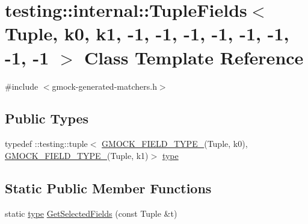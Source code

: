 \hypertarget{classtesting_1_1internal_1_1_tuple_fields_3_01_tuple_00_01k0_00_01k1_00_01-1_00_01-1_00_01-1_00_bfbbbfc9cc03949b0b1ff3620709d8ff}{}\section{testing\+:\+:internal\+:\+:Tuple\+Fields$<$ Tuple, k0, k1, -\/1, -\/1, -\/1, -\/1, -\/1, -\/1, -\/1, -\/1 $>$ Class Template Reference}
\label{classtesting_1_1internal_1_1_tuple_fields_3_01_tuple_00_01k0_00_01k1_00_01-1_00_01-1_00_01-1_00_bfbbbfc9cc03949b0b1ff3620709d8ff}


{\ttfamily \#include $<$gmock-\/generated-\/matchers.\+h$>$}

\subsection*{Public Types}
\begin{DoxyCompactItemize}
\item 
typedef \+::testing\+::tuple$<$ \hyperlink{gmock-generated-matchers_8h_acf3e27de83a73f0d873da1cd471e505b}{G\+M\+O\+C\+K\+\_\+\+F\+I\+E\+L\+D\+\_\+\+T\+Y\+P\+E\+\_\+}(Tuple, k0), \hyperlink{gmock-generated-matchers_8h_acf3e27de83a73f0d873da1cd471e505b}{G\+M\+O\+C\+K\+\_\+\+F\+I\+E\+L\+D\+\_\+\+T\+Y\+P\+E\+\_\+}(Tuple, k1)$>$ \hyperlink{classtesting_1_1internal_1_1_tuple_fields_3_01_tuple_00_01k0_00_01k1_00_01-1_00_01-1_00_01-1_00_bfbbbfc9cc03949b0b1ff3620709d8ff_ad0dd4e84d48ec9a5ef262cf32f6979f9}{type}
\end{DoxyCompactItemize}
\subsection*{Static Public Member Functions}
\begin{DoxyCompactItemize}
\item 
static \hyperlink{classtesting_1_1internal_1_1_tuple_fields_3_01_tuple_00_01k0_00_01k1_00_01-1_00_01-1_00_01-1_00_bfbbbfc9cc03949b0b1ff3620709d8ff_ad0dd4e84d48ec9a5ef262cf32f6979f9}{type} \hyperlink{classtesting_1_1internal_1_1_tuple_fields_3_01_tuple_00_01k0_00_01k1_00_01-1_00_01-1_00_01-1_00_bfbbbfc9cc03949b0b1ff3620709d8ff_aff1691053cc880fe84f27cb6a1c5680f}{Get\+Selected\+Fields} (const Tuple \&t)
\end{DoxyCompactItemize}


